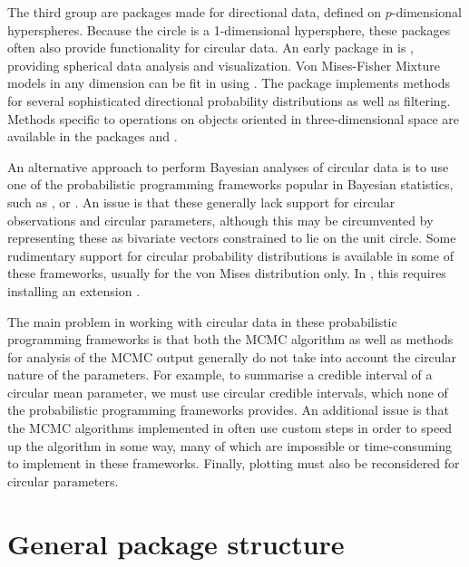 The third group are packages made for directional data, defined on
\(p\)-dimensional hyperspheres. Because the circle is a 1-dimensional
hypersphere, these packages often also provide functionality for
circular data. An early package in  is 
\citep{leong1998methods}, providing spherical data analysis and
visualization. Von Mises-Fisher Mixture models in any dimension can be
fit in  using  \citep{hornik2014movmf}. The
 package 
\citep{kurz2017directional} implements methods for several sophisticated
directional probability distributions as well as filtering. Methods
specific to operations on objects oriented in three-dimensional space
are available in the  packages 
\citep{murdoch2003orientlib} and 
\citep{stanfill2014rotations}.

An alternative approach to perform Bayesian analyses of circular data is
to use one of the probabilistic programming frameworks popular in
Bayesian statistics, such as ,  or
. An issue is that these generally lack support for
circular observations and circular parameters, although this may be
circumvented by representing these as bivariate vectors constrained to
lie on the unit circle. Some rudimentary support for circular
probability distributions is available in some of these frameworks,
usually for the von Mises distribution only. In , this
requires installing an extension \citep{jagsvonmises}.

The main problem in working with circular data in these probabilistic
programming frameworks is that both the MCMC algorithm as well as
methods for analysis of the MCMC output generally do not take into
account the circular nature of the parameters. For example, to summarise
a credible interval of a circular mean parameter, we must use circular
credible intervals, which none of the probabilistic programming
frameworks provides. An additional issue is that the MCMC algorithms
implemented in  often use custom steps in order to speed
up the algorithm in some way, many of which are impossible or
time-consuming to implement in these frameworks. Finally, plotting must
also be reconsidered for circular parameters.

\hypertarget{general-package-structure}{%
\section{General package structure}\label{general-package-structure}}

